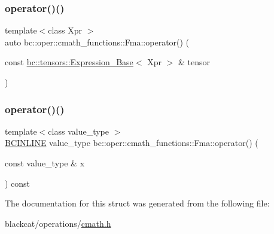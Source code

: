 \mbox{\label{structbc_1_1oper_1_1cmath__functions_1_1Fma_ad542c1c3cdbeee19a82cc58768dafb51}} 
\subsubsection{\texorpdfstring{operator()()}{operator()()}\hspace{0.1cm}{\footnotesize\ttfamily [2/3]}}
{\footnotesize\ttfamily template$<$class Xpr $>$ \\
auto bc\+::oper\+::cmath\+\_\+functions\+::\+Fma\+::operator() (\begin{DoxyParamCaption}\item[{const \hyperlink{classbc_1_1tensors_1_1Expression__Base}{bc\+::tensors\+::\+Expression\+\_\+\+Base}$<$ Xpr $>$ \&}]{tensor }\end{DoxyParamCaption})\hspace{0.3cm}{\ttfamily [inline]}}

\mbox{\label{structbc_1_1oper_1_1cmath__functions_1_1Fma_a827d850bf5eecfbb901ba1e9722b1b18}} 
\subsubsection{\texorpdfstring{operator()()}{operator()()}\hspace{0.1cm}{\footnotesize\ttfamily [3/3]}}
{\footnotesize\ttfamily template$<$class value\+\_\+type $>$ \\
\hyperlink{common_8h_a6699e8b0449da5c0fafb878e59c1d4b1}{B\+C\+I\+N\+L\+I\+NE} value\+\_\+type bc\+::oper\+::cmath\+\_\+functions\+::\+Fma\+::operator() (\begin{DoxyParamCaption}\item[{const value\+\_\+type \&}]{x }\end{DoxyParamCaption}) const\hspace{0.3cm}{\ttfamily [inline]}}



The documentation for this struct was generated from the following file\+:\begin{DoxyCompactItemize}
\item 
blackcat/operations/\hyperlink{cmath_8h}{cmath.\+h}\end{DoxyCompactItemize}
